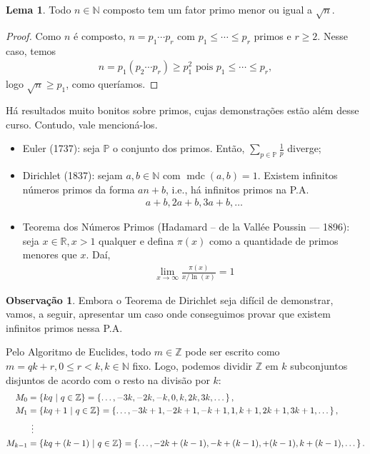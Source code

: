 \documentclass[a4paper,11pt,twoside, leqno]{article}
\DeclareMathOperator{\mdc}{mdc}
\theoremstyle{definition}
\newtheorem{lemma}[theorem]{Lema}
\newtheorem{remark}{Observação}[section]
\begin{document}
\begin{lemma}
	\label{lema 19}
	Todo $n\in\mathbb{N}$ composto tem um fator primo menor ou igual a $\sqrt{n}$.
\end{lemma}
\begin{proof}
	Como $n$ é composto, $n=p_1\cdots p_r$ com $p_1\leq \cdots \leq p_r$ primos e $r\geq 2$. Nesse caso, temos
	\begin{align*}
	n = p_1\left( p_2\cdots p_r \right)\geq p_1^2 \text{ pois } p_1\leq \cdots \leq p_r,
	\end{align*}
	logo $\sqrt{n}\geq p_1$, como queríamos.
\end{proof}
Há resultados muito bonitos sobre primos, cujas demonstrações estão além desse curso. Contudo, vale mencioná-los.
\begin{itemize}
	\item Euler (1737): seja $\mathbb{P}$ o conjunto dos primos. Então, $\displaystyle{\sum_{p\in\mathbb{P}} \frac{1}{p} }$ diverge;
	\item Dirichlet (1837): sejam $a,b\in\mathbb{N}$ com $\mdc(a,b) = 1$. Existem infinitos números primos da forma $an + b$, i.e., há infinitos primos na P.A.
	\begin{align*}
	a+b, 2a+b, 3a+b, \dots 
	\end{align*}
	\item Teorema dos Números Primos (Hadamard -- de la Vallée Poussin --- 1896): seja $x\in\mathbb{R}, x>1$ qualquer e defina $\pi(x)$ como a quantidade de primos menores que $x$. Daí,
	\begin{align*}
	\displaystyle{ \lim_{x\to\infty}{ \frac{\pi(x)}{x/\ln(x)} } = 1 }
	\end{align*}
\end{itemize}
\begin{remark}
	\label{obs 5}
	Embora o Teorema de Dirichlet seja difícil de demonstrar, vamos, a seguir, apresentar um caso onde conseguimos provar que existem infinitos primos nessa P.A.
\end{remark}
Pelo Algoritmo de Euclides, todo $m\in\mathbb{Z}$ pode ser escrito como $m = qk + r, 0\leq r < k, k\in\mathbb{N}$ fixo. Logo, podemos dividir $\mathbb{Z}$ em $k$ subconjuntos disjuntos de acordo com o resto na divisão por $k$:
\begin{align*}
M_0 &= \left\{ kq \ | \ q\in\mathbb{Z} \right\} = \left\{ \dots, -3k, -2k, -k, 0, k, 2k, 3k, \dots \right\}, \\
M_1 &= \left\{ kq + 1 \ | \ q\in\mathbb{Z} \right\} = \left\{ \dots, -3k+1, -2k+1, -k+1, 1, k+1, 2k+1, 3k+1, \dots \right\}, \\
&\hspace{0.15cm}\vdots \\
M_{k-1} &= \left\{ kq + (k-1) \ | \ q\in\mathbb{Z} \right\} = \left\{ \dots, -2k+ (k-1), -k+ (k-1), + (k-1), k+ (k-1), \dots \right\}. 
\end{align*}
\end{document}
